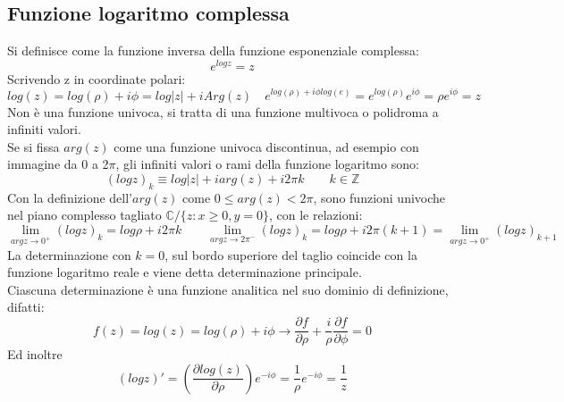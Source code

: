 \documentclass[twoside]{article}
\begin{document}
    \subsection{Funzione logaritmo complessa}
    Si definisce come la funzione inversa della funzione esponenziale complessa:
    \begin{equation}
        e^{logz}=z
    \end{equation}
    Scrivendo z in coordinate polari:
    \begin{equation}
       log(z)=log(\rho)+i\phi=log|z|+iArg(z) \quad e^{log(\rho)+i\phi log(e)}=e^{log(\rho)}e^{i\phi}=\rho e^{i\phi}=z
    \end{equation}
    Non è una funzione univoca, si tratta di una funzione multivoca o polidroma a infiniti valori.\\
    Se si fissa $arg(z)$ come una funzione univoca discontinua, ad esempio con immagine da 0 a 2$\pi$, gli infiniti valori o rami della funzione logaritmo sono:
    \begin{equation}
        (logz)_k\equiv log|z|+iarg(z)+i2\pi k \qquad k\in\mathds{Z}
    \end{equation}
    Con la definizione dell'$arg(z)$ come $0\le arg(z)<2\pi$, sono funzioni univoche nel piano complesso tagliato $\mathds{C}/\{z:x\ge0,y=0\}$, con le relazioni:
    \begin{equation}
    \lim_{argz\to0^+}(logz)_k=log\rho + i2\pi k \qquad \lim\limits_{argz\to 2\pi^-}(logz)_k=log\rho + i2\pi (k+1)= \lim_{argz\to0^+}(logz)_{k+1}
    \end{equation}
    La determinazione con $k=0$, sul bordo superiore del taglio coincide con la funzione logaritmo reale e viene detta determinazione principale.\\
    Ciascuna determinazione è una funzione analitica nel suo dominio di definizione, difatti:
    \begin{equation}
        f(z)=log(z)=log(\rho)+i\phi \longrightarrow \frac{\partial f}{\partial \rho}+\frac{i}{\rho}\frac{\partial f}{\partial \phi}=0
    \end{equation}
    Ed inoltre
    \begin{equation}
        (logz)'=\left(\frac{\partial log(z)}{\partial \rho}\right) e^{-i\phi}=\frac{1}{\rho}e^{-i\phi}=\frac{1}{z}
    \end{equation}
\end{document}
